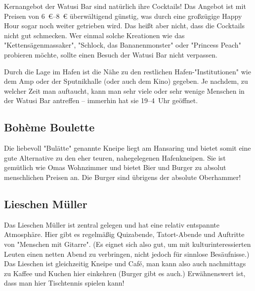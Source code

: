 {\begin{multicols*}{2}
Kernangebot der Watusi Bar sind natürlich ihre Cocktails!
Das Angebot ist mit Preisen von \SIrange{6}{8}{\euro} überwältigend günstig, was durch eine großzügige Happy Hour sogar noch weiter getrieben wird.
Das heißt aber nicht, dass die Cocktails nicht gut schmecken.
Wer einmal solche Kreationen wie das "Kettensägenmassaker", "Schlock, das Bananenmonster" oder "Princess Peach" probieren möchte, sollte einen Besuch der Watusi Bar nicht verpassen.

Durch die Lage im Hafen ist die Nähe zu den restlichen Hafen-"Institutionen" wie dem Amp oder der Sputnikhalle (oder auch dem Kino) gegeben.
Je nachdem, zu welcher Zeit man auftaucht, kann man sehr viele oder sehr wenige Menschen in der Watusi Bar antreffen -- immerhin hat sie 19--4~Uhr geöffnet.

\begin{center}
\end{center}

\subsection{Bohème Boulette}
Die liebevoll "Bulätte" genannte Kneipe liegt am Hansaring und bietet somit eine gute Alternative zu den eher teuren, nahegelegenen Hafenkneipen.
Sie ist gemütlich wie Omas Wohnzimmer und bietet Bier und Burger zu absolut menschlichen Preisen an.
Die Burger sind übrigens der absolute Oberhammer!

\begin{center}
\end{center}

\subsection{Lieschen Müller} %
Das Lieschen Müller ist zentral gelegen und hat eine relativ entspannte Atmosphäre. Hier gibt es regelmäßig Quizabende, Tatort-Abende und Auftritte von "Menschen mit Gitarre". (Es eignet sich also gut, um mit kulturinteressierten Leuten einen netten Abend zu verbringen, nicht jedoch für sinnlose Besäufnisse.) Das Lieschen ist gleichzeitig Kneipe und Café, man kann also auch nachmittags zu Kaffee und Kuchen hier einkehren (Burger gibt es auch.) Erwähnenswert ist, dass man hier Tischtennis spielen kann!


\end{multicols*}}
